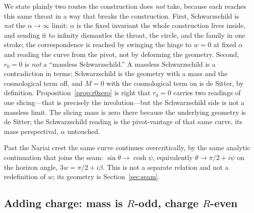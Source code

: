 \documentclass[11pt,a4paper]{article}
\theoremstyle{definition}
\begin{document}
We state plainly two routes the construction does \emph{not} take, because each reaches this same throat in a way that breaks the construction. First, Schwarzschild is \emph{not} the $\alpha\to\infty$ limit: $\alpha$ is the fixed invariant the whole construction lives inside, and sending it to infinity dismantles the throat, the circle, and the family in one stroke; the correspondence is reached by swinging the hinge to $w=0$ at fixed $\alpha$ and reading the curve from the pivot, not by deforming the geometry. Second, $r_{0}=0$ is \emph{not} a ``massless Schwarzschild.'' A massless Schwarzschild is a contradiction in terms: Schwarzschild is the geometry with a mass and the cosmological term off, and $M=0$ with the cosmological term on is de Sitter, by definition. Proposition~\ref{prop:r0zero} is right that $r_{0}=0$ carries two readings of one slicing---that is precisely the involution---but the Schwarzschild side is not a massless limit. The slicing mass is zero there because the underlying geometry is de Sitter; the Schwarzschild reading is the pivot-vantage of that same curve, its mass perspectival, $\alpha$ untouched.

Past the Nariai crest the same curve continues overcritically, by the same analytic continuation that joins the seam: $\sin\theta\to\cosh\psi$, equivalently $\theta\to\pi/2+i\psi$ on the horizon angle, $3w=\pi/2+i\beta$. This is not a separate relation and not a redefinition of $w$; its geometry is Section~\ref{sec:seam}.

\subsection{Adding charge: mass is $R$-odd, charge $R$-even}\label{sec:charge}
\end{document}
